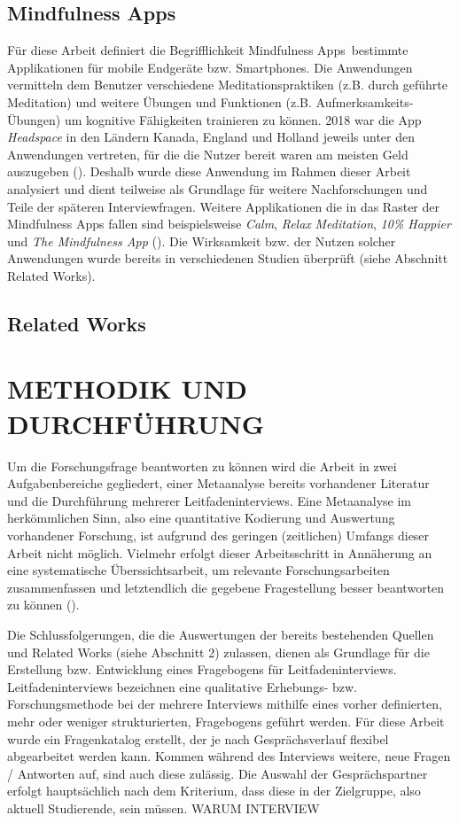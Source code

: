 \documentclass[10pt]{article}
\newcommand{\zit}[1]{(\cite{#1})}
\begin{document}
\subsection{Mindfulness Apps}
Für diese Arbeit definiert die Begrifflichkeit  \grqq Mindfulness Apps\grqq\ bestimmte Applikationen für mobile Endgeräte bzw. Smartphones. Die Anwendungen vermitteln dem Benutzer verschiedene Meditationspraktiken (z.B. durch geführte Meditation) und weitere Übungen und Funktionen (z.B. Aufmerksamkeits-Übungen) um kognitive Fähigkeiten trainieren zu können. 2018 war die App \textit{Headspace} in den Ländern Kanada, England und Holland jeweils unter den Anwendungen vertreten, für die die Nutzer bereit waren am meisten Geld auszugeben \zit{SteigendeNutzung}. Deshalb wurde diese Anwendung im Rahmen dieser Arbeit analysiert und dient teilweise als Grundlage für weitere Nachforschungen und Teile der späteren Interviewfragen. 
Weitere Applikationen die in das Raster der Mindfulness Apps fallen sind beispielsweise \textit{Calm}, \textit{Relax} \textit{Meditation}, \textit{10\% Happier} und\textit{ The Mindfulness App }\zit{VergleichApps}. Die Wirksamkeit bzw. der Nutzen solcher Anwendungen wurde bereits in verschiedenen Studien überprüft (siehe Abschnitt Related Works).
\subsection{Related Works}


\section{METHODIK UND DURCHFÜHRUNG}
Um die Forschungsfrage beantworten zu können wird die Arbeit in zwei Aufgabenbereiche gegliedert, einer Metaanalyse bereits vorhandener Literatur und die Durchführung mehrerer Leitfadeninterviews. 
Eine Metaanalyse im herkömmlichen Sinn, also eine quantitative Kodierung und Auswertung vorhandener Forschung, ist aufgrund des geringen (zeitlichen) Umfangs dieser Arbeit nicht möglich. Vielmehr erfolgt dieser Arbeitsschritt in Annäherung an eine systematische Überssichtsarbeit, um relevante Forschungsarbeiten zusammenfassen und letztendlich die gegebene Fragestellung besser beantworten zu können \zit{Metaanalyse}.

Die Schlussfolgerungen, die die Auswertungen der bereits bestehenden Quellen und Related Works (siehe Abschnitt 2) zulassen, dienen als Grundlage für die Erstellung bzw. Entwicklung eines Fragebogens für Leitfadeninterviews. Leitfadeninterviews bezeichnen eine qualitative Erhebungs- bzw. Forschungsmethode bei der mehrere Interviews mithilfe eines vorher definierten, mehr oder weniger strukturierten, Fragebogens geführt werden. Für diese Arbeit wurde ein Fragenkatalog erstellt, der je nach Gesprächsverlauf flexibel abgearbeitet werden kann. Kommen während des Interviews weitere, neue Fragen / Antworten auf, sind auch diese zulässig. 
Die Auswahl der Gesprächspartner erfolgt hauptsächlich nach dem Kriterium, dass diese in der Zielgruppe, also aktuell Studierende, sein müssen.  WARUM INTERVIEW
\end{document}
